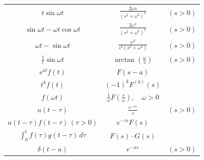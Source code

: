 \begin{center}
  \begin{tabular}{ccc}
    $t\sin\omega t$                                      & $\displaystyle{\frac{2\omega s}{(s^{2}+\omega^{2})^{2}}}$                     & $(s>0)$ \\[15pt]
    $\sin\omega t-\omega t\cos\omega t$                  & $\displaystyle{\frac{2\omega^{3}}{(s^{2}+\omega^{2})^{2}}}$                   & $(s>0)$ \\[15pt]
    $\omega t-\sin\omega t$                              & $\displaystyle{\frac{\omega^{3}}{s^{2}(s^{2}+\omega^{2})}}$               & $(s>0)$ \\[15pt]
    $\displaystyle{\frac{1}{t}\sin\omega t}$             & $\displaystyle{\arctan\left(\frac{\omega}{s}\right)}$                         & $(s>0)$ \\[15pt]
    $e^{at}f(t)$                                         & $F(s-a)$                                                                      &         \\[15pt]
    $t^{k}f(t)$                                          & $\displaystyle{{(-1)^{k}F^{(k)}(s)}}$                                         &         \\[15pt]
    $f(\omega t)$                                        & $\displaystyle{\frac{1}{\omega}F\left(\frac{s}{\omega}\right),\quad\omega>0}$ &         \\[15pt]
    $u(t-\tau)$                                          & $\displaystyle{\frac{e^{-\tau s}}{s}}$                                        & $(s>0)$ \\[15pt]
    $u(t-\tau)f(t-\tau)\,(\tau>0)$                       & $e^{-\tau s}F(s)$                                                             &         \\[15pt]
    $\displaystyle{\int^{t}_{0}f(\tau)g(t-\tau)\,d\tau}$ & $F(s)\cdot G(s)$                                                              &         \\[15pt]
    $\delta(t-a)$                                        & $e^{-as}$                                                                     & $(s>0)$ \\[15pt]
  \end{tabular}
\end{center}
